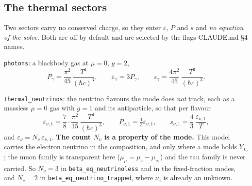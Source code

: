 \documentclass[aps,prc,onecolumn,superscriptaddress,nofootinbib,10pt]{revtex4-2}
\begin{document}
\subsection{The thermal sectors}
\label{sec:thermalsectors}

Two sectors carry no conserved charge, so they enter $\varepsilon$, $P$ and
$s$ and \emph{no equation of the solve}. Both are off by default and are
selected by the flags CLAUDE.md \S4 names.

\texttt{photons}: a blackbody gas at $\mu = 0$, $g = 2$,
%
\begin{equation}
P_\gamma = \frac{\pi^2}{45}\,\frac{T^4}{(\hbar c)^3} , \qquad
\varepsilon_\gamma = 3 P_\gamma , \qquad
s_\gamma = \frac{4\pi^2}{45}\,\frac{T^3}{(\hbar c)^3} .
\label{eq:photon}
\end{equation}

\texttt{thermal\_neutrinos}: the neutrino flavours the mode does \emph{not}
track, each as a massless $\mu = 0$ gas with $g = 1$ and its antiparticle, so
that per flavour
%
\begin{equation}
\varepsilon_{\nu,1} = \frac{7}{8}\cdot\frac{\pi^2}{15}\,
   \frac{T^4}{(\hbar c)^3} , \qquad
P_{\nu,1} = \tfrac13 \varepsilon_{\nu,1} , \qquad
s_{\nu,1} = \frac{4}{3}\,\frac{\varepsilon_{\nu,1}}{T} ,
\label{eq:thermalnu}
\end{equation}
%
and $\varepsilon_\nu = N_\nu\,\varepsilon_{\nu,1}$. \textbf{The count $N_\nu$
is a property of the mode.} This model carries the electron neutrino in the
composition, and only where a mode holds $Y_{L_e}$; the muon family is
transparent here ($\mu_\mu = \mu_e - \mu_{\nu_e}$) and the tau family is never
carried. So $N_\nu = 3$ in \texttt{beta\_eq\_neutrinoless} and in the
fixed-fraction modes, and $N_\nu = 2$ in
\texttt{beta\_eq\_neutrino\_trapped}, where $\nu_e$ is already an unknown.
\end{document}
